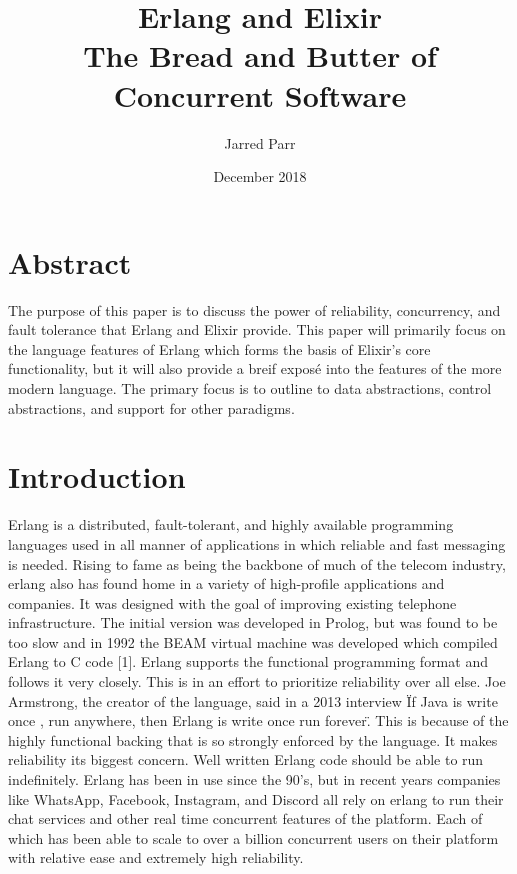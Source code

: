 \documentclass[11pt]{article}
\begin{document}
\title{%
  Erlang and Elixir \\
  \large The Bread and Butter of Concurrent Software}
\author{Jarred Parr}
\date{December 2018}
\maketitle

\section{Abstract}
The purpose of this paper is to discuss the power of reliability, concurrency, and fault tolerance that Erlang and Elixir provide. This paper will primarily focus on the language features of Erlang which forms the basis of Elixir's core functionality,
but it will also provide a breif exposé into the features of the more modern language. The primary focus is to outline to data abstractions, control abstractions, and support for other paradigms.

\section{Introduction}
Erlang is a distributed, fault-tolerant, and highly available programming languages used in all manner of applications in which reliable and fast messaging is needed. Rising to fame as being the backbone of much of the telecom industry, erlang also has found home
in a variety of high-profile applications and companies. It was designed with the goal of improving existing telephone infrastructure. The initial version was developed in Prolog, but was found to be too slow and in 1992 the BEAM virtual machine was developed which compiled Erlang to C code [1]. Erlang supports the functional programming format and follows it very closely. This is in an effort to prioritize reliability over all else. Joe Armstrong, the creator of the language, said in a 2013 interview \"If Java is write once
, run anywhere, then Erlang is write once run forever\". This is because of the highly functional backing that is so strongly enforced by the language. It makes reliability its biggest concern. Well written Erlang code should be able to run indefinitely. Erlang has
been in use since the 90's, but in recent years companies like WhatsApp, Facebook, Instagram, and Discord all rely on erlang to run their chat services and other real time concurrent features of the platform. Each of which has been able to scale to over a billion
concurrent users on their platform with relative ease and extremely high reliability.
\end{document}
